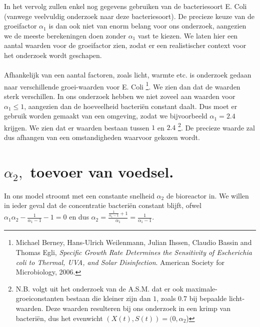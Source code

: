 In het vervolg zullen enkel nog gegevens gebruiken van de bacteriesoort E. Coli (vanwege veelvuldig onderzoek naar deze bacteriesoort). De precieze keuze van de groeifactor $\alpha_1$ is dan ook niet van enorm belang voor ons onderzoek, aangezien we de meeste berekeningen doen zonder $\alpha_1$ vast te kiezen. We laten hier een aantal waarden voor de groeifactor zien, zodat er een realistischer context voor het onderzoek wordt geschapen. 
\\
\\
Afhankelijk van een aantal factoren, zoals licht, warmte etc. is onderzoek gedaan naar verschillende groei-waarden voor E. Coli \footnote{Michael Berney, Hans-Ulrich Weilenmann, Julian Ihssen, Claudio Bassin and Thomas Egli,
  \emph{Specific Growth Rate Determines the Sensitivity of Escherichia coli to Thermal, UVA, and Solar Disinfection}.
  American Society for Microbiology, 
  2006.}. We zien dan dat de waarden sterk verschillen. In ons onderzoek hebben we niet zoveel aan waarden voor $\alpha_1\leq1$, aangezien dan de hoeveelheid bacteri\"en constant daalt. Dus moet er gebruik worden gemaakt van een omgeving, zodat we bijvoorbeeld $\alpha_1 = 2.4$ krijgen. We zien dat er waarden bestaan tussen $1$ en $2.4$ \footnote{N.B. volgt uit het onderzoek van de A.S.M. dat er ook maximale-groeiconstanten bestaan die kleiner zijn dan $1$, zoals $0.7$ bij bepaalde licht-waarden. Deze waarden resulteren bij ons onderzoek in een krimp van bacteri\"en, dus het evenwicht $(X(t), S(t)) = (0, \alpha_2$) }. De precieze waarde zal dus afhangen van een omstandigheden waarvoor gekozen wordt.


\section{$\alpha_2,$ toevoer van voedsel.}
In ons model stroomt met een constante snelheid $\alpha_2$ de bioreactor in. We willen in ieder geval dat de concentratie bacteri\"en constant blijft, ofwel $\alpha_1\alpha_2-\frac{1}{\alpha_1-1}-1 = 0$ en dus $\alpha_2 = \frac{\frac{1}{\alpha_1-1}+1}{\alpha_1}=\frac{1}{\alpha_1-1}$.

